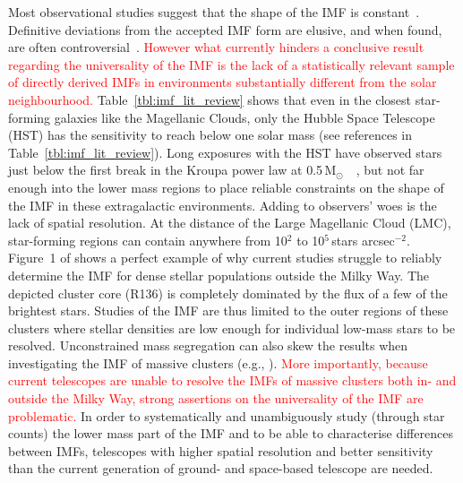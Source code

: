 \documentclass{aa}
\newcommand{\msun}{M$_\odot$~}
\newcommand{\h}[1]{$^{#1}$}
\newcommand{\spae}{stars arcsec$^{-2}$}
\newcommand{\langedit}[1]{\textcolor{red}{#1}}
\begin{document}
Most observational studies suggest that the shape of the IMF is constant~\citep{Lada2003-ip,Kroupa2002,Bastian2010}.
Definitive deviations from the accepted IMF form are elusive, and when found, are often controversial~\citep{Van_Dokkum2010-gx,Conroy2012-hv,Drass2016-kp}.
\langedit{However what currently hinders a conclusive result regarding the universality of the IMF is the lack of a statistically relevant sample of directly derived IMFs in environments substantially different from the solar neighbourhood.}
Table~\ref{tbl:imf_lit_review} shows that even in the closest star-forming galaxies like the Magellanic Clouds, only the Hubble Space Telescope (HST) has the sensitivity to reach below one solar mass (see references in Table~\ref{tbl:imf_lit_review}).
Long exposures with the HST have observed stars just below the first break in the Kroupa power law at 0.5\,\msun~\citep{dario2009,kalirai2013,geha2013}, but not far enough into the lower mass regions to place reliable constraints on the shape of the IMF in these extragalactic environments.
Adding to observers' woes is the lack of spatial resolution.
At the distance of the Large Magellanic Cloud (LMC), star-forming regions can contain anywhere from 10\h2 to 10\h5\,\spae.
Figure~1 of \citet{sirianni2000} shows a perfect example of why current studies struggle to reliably determine the IMF for dense stellar populations outside the Milky Way.
The depicted cluster core (R136) is completely dominated by the flux of a few of the brightest stars.
Studies of the IMF are thus limited to the outer regions of these clusters where stellar densities are low enough for individual low-mass stars to be resolved.
Unconstrained mass segregation can also skew the results when investigating the IMF of massive clusters (e.g., \citealt{Ascenso2009-de}).
\langedit{More importantly, because current telescopes are unable to resolve the IMFs of massive clusters both in- and outside the Milky Way, strong assertions on the universality of the IMF are problematic.}
In order to systematically and unambiguously study (through star counts) the lower mass part of the IMF and to be able to characterise differences between IMFs, telescopes with higher spatial resolution and better sensitivity than the current generation of ground- and space-based telescope are needed.
\end{document}
